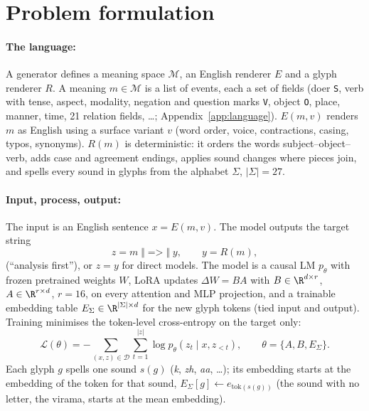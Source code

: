 \documentclass{article} %
\newcommand{\an}[1]{\texttt{#1}}
\begin{document}
\section{Problem formulation}\label{sec:problem}

\paragraph{The language:} A generator defines a meaning space $\mathcal{M}$, an English renderer $E$ and a glyph
renderer $R$. A meaning $m\in\mathcal{M}$ is a list of events, each a set of fields (doer \an{S}, verb with tense,
aspect, modality, negation and question marks \an{V}, object \an{O}, place, manner, time, 21 relation fields, \ldots;
Appendix~\ref{app:language}). $E(m, v)$ renders $m$ as English using a surface variant $v$ (word order, voice,
contractions, casing, typos, synonyms). $R(m)$ is deterministic: it orders the words subject--object--verb, adds
case and agreement endings, applies sound changes where pieces join, and spells every sound in glyphs from the
alphabet $\Sigma$, $|\Sigma|=27$.

\paragraph{Input, process, output:} The input is an English sentence $x = E(m, v)$. The model outputs the target
string
\begin{equation}
z = m \;\Vert\; \texttt{=>} \;\Vert\; y, \qquad y = R(m),
\end{equation}
(``analysis first''), or $z=y$ for direct models. The model is a causal LM $p_\theta$ with frozen pretrained weights
$W$, LoRA updates $\Delta W = BA$ with $B\in\R^{d\times r}$, $A\in\R^{r\times d}$, $r=16$, on every attention and MLP
projection, and a trainable embedding table $E_\Sigma\in\R^{|\Sigma|\times d}$ for the new glyph tokens (tied input
and output). Training minimises the token-level cross-entropy on the target only:
\begin{equation}
\mathcal{L}(\theta) = -\sum_{(x,z)\in\mathcal{D}} \sum_{t=1}^{|z|} \log p_\theta(z_t \mid x, z_{<t}),
\qquad \theta = \{A, B, E_\Sigma\}.
\end{equation}
Each glyph $g$ spells one sound $s(g)$ (\emph{k}, \emph{zh}, \emph{aa}, \ldots); its embedding starts at the
embedding of the token for that sound, $E_\Sigma[g] \leftarrow e_{\mathrm{tok}(s(g))}$ (the sound with no letter,
the virama, starts at the mean embedding).
\end{document}
